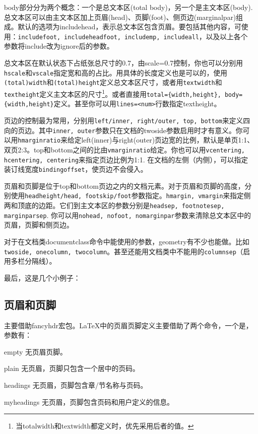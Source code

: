 body部分分为两个概念：一个是总文本区(total body)，另一个是主文本区(body). 总文本区可以由主文本区加上页眉(head)、页脚(foot)、侧页边(marginalpar)组成。默认的选项为includehead，表示总文本区包含页眉。要包括其他内容，可使用：\texttt{includefoot, includeheadfoot, includemp, includeall}，以及以上各个参数将include改为ignore后的参数。

总文本区在默认状态下占纸张总尺寸的0.7，由scale=0.7控制，你也可以分别用\texttt{hscale}和\texttt{vscale}指定宽和高的占比。用具体的长度定义也是可以的，使用\texttt{(total)width}和\texttt{(total)height}定义总文本区尺寸，或者用\texttt{textwidth}和\texttt{textheight}定义主文本区的尺寸\footnote{当totalwidth和textwidth都定义时，优先采用后者的值。}。或者直接用\texttt{total=\{width,height\}, body=\{width,height\}}定义。甚至你可以用\texttt{lines=<num>}行数指定textheight。

页边的控制最为常用，分别用\texttt{left/inner, right/outer, top, bottom}来定义四向的页边。其中\texttt{inner, outer}参数只在文档的twoside参数启用时才有意义。你可以用\texttt{hmarginratio}来给定left(inner)与right(outer)页边宽的比例，默认是单页1:1、双页2:3。top和bottom之间的比由\texttt{vmarginratio}给定。你也可以用\texttt{vcentering, hcentering, centering}来指定页边比例为1:1. 在文档的左侧（内侧），可以指定装订线宽度\texttt{bindingoffset}，使页边不会侵入。

页眉和页脚是位于top和bottom页边之内的文档元素。对于页眉和页脚的高度，分别使用\texttt{headheight/head, footskip/foot}参数指定。\texttt{hmargin, vmargin}来指定侧两和顶底的边距。它们到主文本区的参数分别是\texttt{headsep, footnotesep, marginparsep}. 你可以用\texttt{nohead, nofoot, nomarginpar}参数来清除总文本区中的页眉，页脚和侧页边。

对于在文档类documentclass命令中能使用的参数，geometry有不少也能做。比如\texttt{twoside, onecolumn, twocolumn}。甚至还能用文档类中不能用的\texttt{columnsep}（启用多栏分隔线）。

最后，这是几个小例子：
\begin{latex}
\usepackage[hmargin=1.25in,vmargin=1in]{geometry}
\usepackage[inner=1in,outer=1.25in]{geometry}
\end{latex}

\subsection{页眉和页脚}
主要借助fancyhdr宏包。\LaTeX 中的页眉页脚定义主要借助了两个命令，一个是，参数有：
\begin{para}
\item[empty] 无页眉页脚。
\item[plain] 无页眉，页脚只包含一个居中的页码。
\item[headings] 无页眉，页脚包含章/节名称与页码。
\item[myheadings] 无页眉，页脚包含页码和用户定义的信息。
\end{para}

